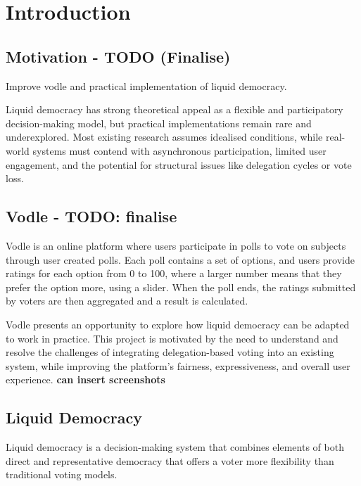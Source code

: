 \chapter{Introduction}\label{ch:introduction_old}

\section{Motivation - TODO (Finalise)}
Improve vodle and practical implementation of liquid democracy.

Liquid democracy has strong theoretical appeal as a flexible and participatory decision-making model, but practical implementations remain rare and underexplored. Most existing research assumes idealised conditions, while real-world systems must contend with asynchronous participation, limited user engagement, and the potential for structural issues like delegation cycles or vote loss.

\section{Vodle - TODO: finalise}
Vodle is an online platform where users participate in polls to vote on subjects through user created polls. Each poll contains a set of options, and users provide ratings for each option from 0 to 100, where a larger number means that they prefer the option more, using a slider. When the poll ends, the ratings submitted by voters are then aggregated and a result is calculated.

Vodle presents an opportunity to explore how liquid democracy can be adapted to work in practice. This project is motivated by the need to understand and resolve the challenges of integrating delegation-based voting into an existing system, while improving the platform's fairness, expressiveness, and overall user experience.
\textbf{can insert screenshots}

\section{Liquid Democracy}
Liquid democracy is a decision-making system that combines elements of both direct and representative democracy that offers a voter more flexibility than traditional voting models.

